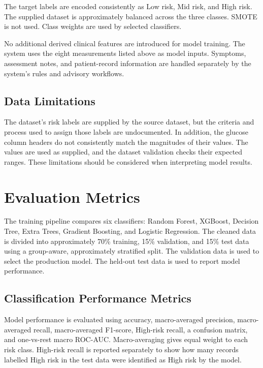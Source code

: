 The target labels are encoded consistently as Low risk, Mid risk, and
High risk. The supplied dataset is approximately balanced across the
three classes. SMOTE is not used. Class weights are used by selected
classifiers.

No additional derived clinical features are introduced for model training.
The system uses the eight measurements listed above as model inputs.
Symptoms, assessment notes, and patient-record information are handled
separately by the system's rules and advisory workflows.

\subsection{Data Limitations}

The dataset's risk labels are supplied by the source dataset, but the
criteria and process used to assign those labels are undocumented. In
addition, the glucose column headers do not consistently match the
magnitudes of their values. The values are used as supplied, and the
dataset validation checks their expected ranges. These limitations should
be considered when interpreting model results.

\section{Evaluation Metrics}

The training pipeline compares six classifiers: Random Forest, XGBoost,
Decision Tree, Extra Trees, Gradient Boosting, and Logistic Regression.
The cleaned data is divided into approximately 70\% training, 15\%
validation, and 15\% test data using a group-aware, approximately
stratified split. The validation data is used to select the production
model. The held-out test data is used to report model performance.

\subsection{Classification Performance Metrics}

Model performance is evaluated using accuracy, macro-averaged precision,
macro-averaged recall, macro-averaged F1-score, High-risk recall, a
confusion matrix, and one-vs-rest macro ROC-AUC. Macro-averaging gives
equal weight to each risk class. High-risk recall is reported separately
to show how many records labelled High risk in the test data were
identified as High risk by the model.

